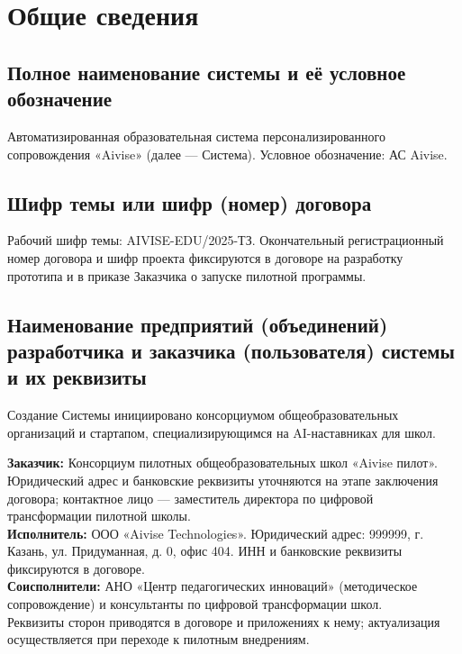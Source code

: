 \documentclass[14pt,a4paper]{extarticle}
\begin{document}
\MakeTitlePage

\AbbrevTable

\tableofcontents
\clearpage

\section{Общие сведения}
\subsection{Полное наименование системы и её условное обозначение}
Автоматизированная образовательная система персонализированного сопровождения «Aivise» (далее — Система).
Условное обозначение: АС Aivise.

\subsection{Шифр темы или шифр (номер) договора}
Рабочий шифр темы: AIVISE-EDU/2025-ТЗ. Окончательный регистрационный номер договора и шифр проекта фиксируются в договоре на разработку прототипа и в приказе Заказчика о запуске пилотной программы.

\subsection{Наименование предприятий (объединений) разработчика и заказчика (пользователя) системы и их реквизиты}
Создание Системы инициировано консорциумом общеобразовательных организаций и стартапом, специализирующимся на AI-наставниках для школ.

\noindent\textbf{Заказчик:} Консорциум пилотных общеобразовательных школ «Aivise пилот». Юридический адрес и банковские реквизиты уточняются на этапе заключения договора; контактное лицо — заместитель директора по цифровой трансформации пилотной школы.\\
\textbf{Исполнитель:} ООО «Aivise Technologies». Юридический адрес: 999999, г. Казань, ул. Придуманная, д. 0, офис 404. ИНН и банковские реквизиты фиксируются в договоре.\\
\textbf{Соисполнители:} АНО «Центр педагогических инноваций» (методическое сопровождение) и консультанты по цифровой трансформации школ.\\[0.5\baselineskip]
Реквизиты сторон приводятся в договоре и приложениях к нему; актуализация осуществляется при переходе к пилотным внедрениям.
\end{document}
